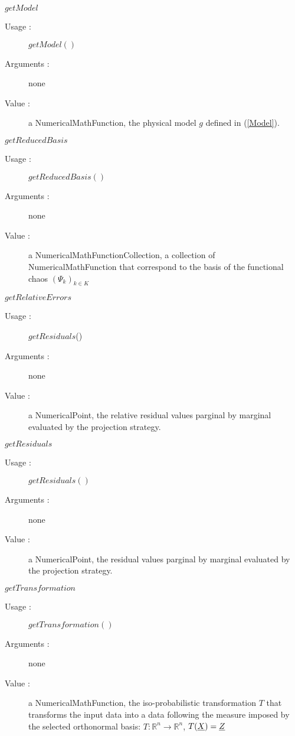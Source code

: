 \begin{description}
\begin{description}
  \item $getModel$
    \begin{description}
    \item[Usage :] $getModel()$
    \item[Arguments :] none
    \item[Value :] a NumericalMathFunction, the physical model $g$ defined in (\ref{Model}).
    \end{description}
    \bigskip


  \item $getReducedBasis$
    \begin{description}
    \item[Usage :] $getReducedBasis()$
    \item[Arguments :] none
    \item[Value :] a NumericalMathFunctionCollection, a collection of NumericalMathFunction that correspond to the basis of the functional chaos $(\Psi_k)_{k\in K}$
    \end{description}
    \bigskip


  \item $getRelativeErrors$
    \begin{description}
    \item[Usage :] $getResiduals$()
    \item[Arguments :] none
    \item[Value :] a NumericalPoint, the relative residual values parginal by marginal evaluated by the projection strategy. 
    \end{description}
    \bigskip


  \item $getResiduals$
    \begin{description}
    \item[Usage :] $getResiduals()$
    \item[Arguments :] none
    \item[Value :] a NumericalPoint, the residual values parginal by marginal evaluated by the projection strategy. 
    \end{description}
    \bigskip


  \item $getTransformation$
    \begin{description}
    \item[Usage :] $getTransformation()$
    \item[Arguments :] none
    \item[Value :] a NumericalMathFunction, the iso-probabilistic transformation $T$ that transforms the input data into a data following the measure imposed by the selected orthonormal basis: $T : \mathbb{R}^n \longrightarrow \mathbb{R}^n $, $T({\underline{X}}) = {\underline{Z}}$
    \end{description}
  


  \end{description}

\end{description}



